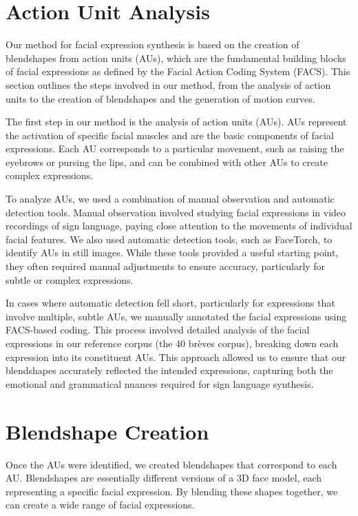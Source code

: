 \documentclass[../../main.tex]{subfiles}
\begin{document}
\section{Action Unit Analysis}
\label{ch:facial_expressions:action_unit_analysis}

Our method for facial expression synthesis is based on the creation of blendshapes from action units (AUs), which are the fundamental building blocks of facial expressions as defined by the Facial Action Coding System (FACS). This section outlines the steps involved in our method, from the analysis of action units to the creation of blendshapes and the generation of motion curves.

The first step in our method is the analysis of action units (AUs). AUs represent the activation of specific facial muscles and are the basic components of facial expressions. Each AU corresponds to a particular movement, such as raising the eyebrows or pursing the lips, and can be combined with other AUs to create complex expressions.

To analyze AUs, we used a combination of manual observation and automatic detection tools. Manual observation involved studying facial expressions in video recordings of sign language, paying close attention to the movements of individual facial features. We also used automatic detection tools, such as FaceTorch, to identify AUs in still images. While these tools provided a useful starting point, they often required manual adjustments to ensure accuracy, particularly for subtle or complex expressions.

In cases where automatic detection fell short, particularly for expressions that involve multiple, subtle AUs, we manually annotated the facial expressions using FACS-based coding. This process involved detailed analysis of the facial expressions in our reference corpus (the 40 brèves corpus), breaking down each expression into its constituent AUs. This approach allowed us to ensure that our blendshapes accurately reflected the intended expressions, capturing both the emotional and grammatical nuances required for sign language synthesis.

\section{Blendshape Creation}
\label{ch:facial_expressions:blendshape_creation}

Once the AUs were identified, we created blendshapes that correspond to each AU. Blendshapes are essentially different versions of a 3D face model, each representing a specific facial expression. By blending these shapes together, we can create a wide range of facial expressions.
\end{document}
